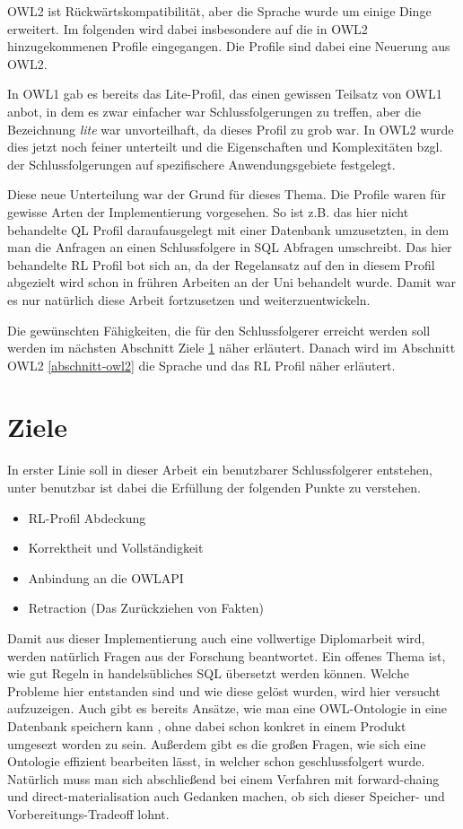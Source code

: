 OWL2 ist Rückwärtskompatibilität, aber die Sprache wurde um einige Dinge erweitert. Im folgenden wird dabei  insbesondere auf die in OWL2 hinzugekommenen Profile eingegangen. Die Profile sind dabei eine Neuerung aus OWL2.

In OWL1 gab es bereits das Lite-Profil, das einen gewissen Teilsatz von OWL1 anbot, in dem es zwar einfacher war Schlussfolgerungen zu treffen, aber die Bezeichnung \emph{lite} war unvorteilhaft, da dieses Profil zu grob war. In OWL2 wurde dies jetzt noch feiner unterteilt und die Eigenschaften und Komplexitäten bzgl. der Schlussfolgerungen auf spezifischere Anwendungsgebiete festgelegt.

Diese neue Unterteilung war der Grund für dieses Thema. Die Profile waren für gewisse Arten der Implementierung vorgesehen. So ist z.B. das hier nicht behandelte QL Profil daraufausgelegt mit einer Datenbank umzusetzten, in dem man die Anfragen an einen Schlussfolgere in SQL Abfragen umschreibt. Das hier behandelte RL Profil bot sich an, da der Regelansatz auf den in diesem Profil abgezielt wird schon in frühren Arbeiten an der Uni behandelt wurde. Damit war es nur natürlich diese Arbeit fortzusetzen und weiterzuentwickeln.

Die gewünschten Fähigkeiten, die für den Schlussfolgerer erreicht werden soll werden im nächsten Abschnitt Ziele \ref{abschnitt-ziele} näher erläutert. Danach wird im Abschnitt OWL2 \ref{abschnitt-owl2} die Sprache und das RL Profil näher erläutert.

\section{Ziele}
\label{abschnitt-ziele}

In erster Linie soll in dieser Arbeit ein benutzbarer Schlussfolgerer entstehen, unter benutzbar ist dabei die Erfüllung der folgenden Punkte zu verstehen.

\begin{itemize}
  \item RL-Profil Abdeckung
  \item Korrektheit und Vollständigkeit
  \item Anbindung an die OWLAPI
  \item Retraction (Das Zurückziehen von Fakten)
\end{itemize}


Damit aus dieser Implementierung auch eine vollwertige Diplomarbeit wird, werden natürlich Fragen aus der Forschung beantwortet. Ein offenes Thema ist, wie gut Regeln in handelsübliches SQL übersetzt werden können. Welche Probleme hier entstanden sind und wie diese gelöst wurden, wird hier versucht aufzuzeigen. Auch gibt es bereits Ansätze, wie man eine OWL-Ontologie in eine Datenbank speichern kann \cite{Kleb2009OWLDB}, ohne dabei schon konkret in einem Produkt umgesezt worden zu sein. Außerdem gibt es die großen Fragen, wie sich eine Ontologie effizient bearbeiten lässt, in welcher schon geschlussfolgert wurde. Natürlich muss man sich abschließend bei einem Verfahren mit forward-chaing und direct-materialisation auch Gedanken machen, ob sich dieser Speicher- und Vorbereitungs-Tradeoff lohnt.

